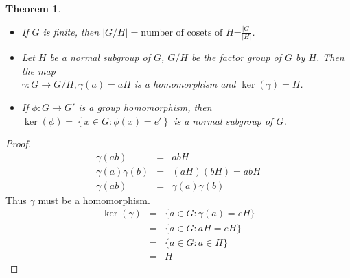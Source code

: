 \documentclass{article}
\theoremstyle{MyNonumberplain}
\theoremstyle{break}
\newtheorem*{proof}{Proof. }
\newcommand{\p}{\phi}
\theoremstyle{break}
\newtheorem{theorem}{Theorem}[section]
\theoremstyle{break}
\theoremstyle{definition}
\theoremstyle{break}
\begin{document}
\begin{thmbox}
    \begin{theorem}
        \begin{itemize}
            \item If $G$ is finite, then $| G / H | = \text{number of cosets of $H$=}
            \frac{| G |}{| H |}$.\bigskip
            
            \item Let $H$ be a normal subgroup of $G$, $G / H$ be the factor group of
            $G$ by $H$. Then the map\\
            
            $\gamma : G \rightarrow G / H, \gamma (a) = a H$ is a homomorphism and $\ker
            (\gamma) = H$.\bigskip
            
            \item If $\p : G \rightarrow G'$ is a group homomorphism, then $\ker \left(
            \p \right) = \left\{ x \in G : \p (x) = e' \right\}$ is a normal subgroup of
            $G$.
          \end{itemize}
    \end{theorem}
    \begin{prfbox}
        \begin{proof}
            \begin{eqnarray*}
                \gamma (a b) & = & a b H\\
                \gamma (a) \gamma (b) & = & (a H) (b H) = a b H\\
                \gamma (a b) & = & \gamma (a) \gamma (b)
              \end{eqnarray*}
              Thus $\gamma$ must be a homomorphism.
              \begin{eqnarray*}
                \ker (\gamma) & = & \{ a \in G : \gamma (a) = e H \}\\
                & = & \{ a \in G : a H = e H \}\\
                & = & \{ a \in G : a \in H \}\\
                & = & H
              \end{eqnarray*}
        \end{proof}
    \end{prfbox}
\end{thmbox}
\end{document}
